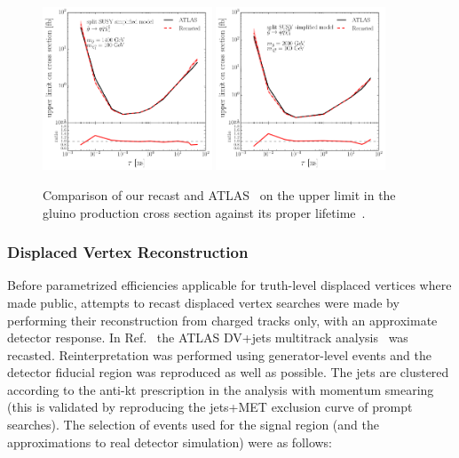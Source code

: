 \begin{figure}[t]
\begin{center}
\includegraphics[width=0.45\textwidth]{ch5-figures/limits_gluino1_FIXED.pdf}
\includegraphics[width=0.45\textwidth]{ch5-figures/limits_gluino2_FIXED.pdf}
\caption{ Comparison of our recast and ATLAS~\cite{Aaboud:2017iio} on the upper limit in the gluino production cross section against its proper lifetime~\cite{LesHouches2017}.}
\label{fig:DVsigmaLimits}
\end{center}
\end{figure}

\subsubsection{Displaced Vertex Reconstruction}

Before parametrized efficiencies applicable for truth-level displaced vertices where made public, attempts to recast displaced vertex searches were made by performing their reconstruction from charged tracks only, with an approximate detector response. In Ref.~\cite{Allanach:2016pam} the ATLAS DV+jets multitrack analysis~\cite{Aad:2015rba} was recasted. Reinterpretation was performed using generator-level events and the detector fiducial region was reproduced as well as possible.  The jets are clustered according to the anti-kt prescription in the analysis with momentum smearing (this is validated by reproducing the jets+MET exclusion curve of prompt searches).  The selection of events used for the signal region (and the approximations to real detector simulation) were as follows:

